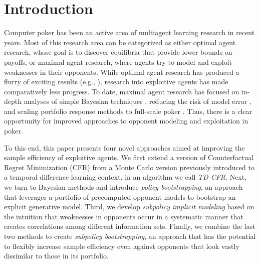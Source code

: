 \documentclass{aamas2013}
\begin{document}







\section{Introduction}
Computer poker has been an active area of multiagent learning research in recent years. Most of this research area can be categorized as either optimal agent research, whose goal is to discover equilibria that provide lower bounds on payoffs, or maximal agent research, where agents try to model and exploit weaknesses in their opponents. While optimal agent research has produced a flurry of exciting results (e.g., \cite{gilpin2006competitive,gilpin2007gradient,cfr,mccfr,pcs}), research into exploitive agents has made comparatively less progress. To date, maximal agent research has focused on in-depth analyses of simple Bayesian techniques \cite{bayesbluff,shortterm}, reducing the risk of model error \cite{rnr,dbr}, and scaling portfolio response methods to full-scale poker \cite{implicit}. Thus, there is a clear opportunity for improved approaches to opponent modeling and exploitation in poker.

To this end, this paper presents four novel approaches aimed at improving the sample efficiency of exploitive agents. We first extend a version of Counterfactual Regret Minimization (CFR) \cite{cfr} from a Monte Carlo version previously introduced \cite{mccfr} to a temporal difference learning \cite{sutton1998reinforcement} context, in an algorithm we call \textit{TD-CFR}. Next, we turn to Bayesian methods and introduce \textit{policy bootstrapping}, an approach that leverages a portfolio of precomputed opponent models to bootstrap an explicit generative model. Third, we develop \textit{subpolicy implicit modeling} based on the intuition that weaknesses in opponents occur in a systematic manner that creates correlations among different information sets. Finally, we combine the last two methods to create \textit{subpolicy bootstrapping}, an approach that has the potential to flexibly increase sample efficiency even against opponents that look vastly dissimilar to those in its portfolio.
\end{document}
